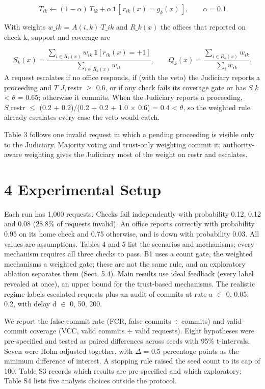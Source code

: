 \documentclass[10pt]{article}
\begin{document}
\[T_{ik} \leftarrow (1-\alpha)\,T_{ik} + \alpha\,\mathbf{1}[\,r_{ik}(x) = g_k(x)\,], \qquad \alpha = 0.1\]

With weights $w\_{ik}$ = $A(i,k)$$\cdot$$T\_{ik}$ and $R\_k(x)$ the offices that reported on check k, support and coverage are

\[S_k(x) = \frac{\sum_{i \in R_k(x)} w_{ik}\,\mathbf{1}[r_{ik}(x) = +1]}{\sum_{i \in R_k(x)} w_{ik}}, \qquad Q_k(x) = \frac{\sum_{i \in R_k(x)} w_{ik}}{\sum_{i} w_{ik}}.\]
A request escalates if no office responds, if (with the veto) the Judiciary reports a proceeding and $T\_{J,\mathrm{restr}}$ $\geq$ 0.6, or if any check fails its coverage gate or has $S\_k$ < $\theta$ = 0.65; otherwise it commits. When the Judiciary reports a proceeding, $S\_\mathrm{restr}$ $\leq$ (0.2 + 0.2)/(0.2 + 0.2 + 1.0 $\times$ 0.6) = 0.4 < $\theta$, so the weighted rule already escalates every case the veto would catch.

Table 3 follows one invalid request in which a pending proceeding is visible only to the Judiciary. Majority voting and trust-only weighting commit it; authority-aware weighting gives the Judiciary most of the weight on restr and escalates.


\section*{4 Experimental Setup}
Each run has 1,000 requests. Checks fail independently with probability 0.12, 0.12 and 0.08 (28.8\% of requests invalid). An office reports correctly with probability 0.95 on its home check and 0.75 otherwise, and is down with probability 0.03. All values are assumptions. Tables 4 and 5 list the scenarios and mechanisms; every mechanism requires all three checks to pass. B1 uses a count gate, the weighted mechanisms a weighted gate; these are not the same rule, and an exploratory ablation separates them (Sect. 5.4). Main results use ideal feedback (every label revealed at once), an upper bound for the trust-based mechanisms. The realistic regime labels escalated requests plus an audit of commits at rate a $\in$ {0, 0.05, 0.2}, with delay d $\in$ {0, 50, 200}.



We report the false-commit rate (FCR, false commits $\div$ commits) and valid-commit coverage (VCC, valid commits $\div$ valid requests). Eight hypotheses were pre-specified and tested as paired differences across seeds with 95\% t-intervals. Seven were Holm-adjusted together, with $\Delta$ = 0.5 percentage points as the minimum difference of interest. A stopping rule raised the seed count to its cap of 100. Table S3 records which results are pre-specified and which exploratory; Table S4 lists five analysis choices outside the protocol.
\end{document}

